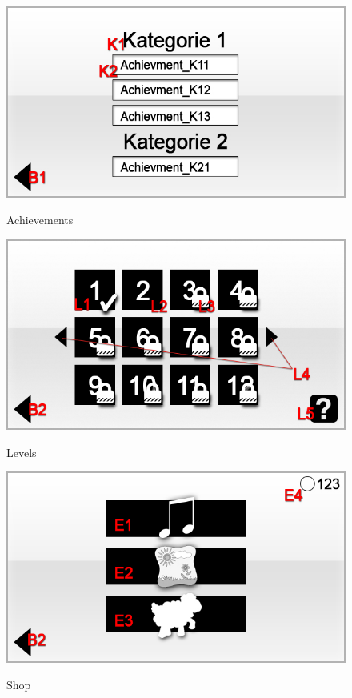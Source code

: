 \begin{figure}[H]
\centering
{}\label{fig:achievments}
\includegraphics[scale=0.55]{../GUI-Entwurf/_jpeg_numeration/achievments.jpg}
\caption{Achievements}
\end{figure}

\begin{figure}[H]
\centering
{}\label{fig:level}
\includegraphics[scale=0.55]{../GUI-Entwurf/_jpeg_numeration/level.jpg}
\caption{Levels}
\end{figure}

\begin{figure}[H]
\label{fig:shop}
\centering
\includegraphics[scale=0.55]{../GUI-Entwurf/_jpeg_numeration/shop.jpg}
\caption{Shop}
\end{figure}

